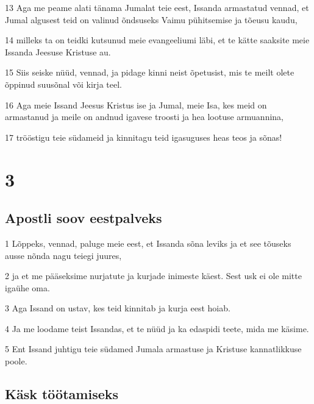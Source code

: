 \par 13 Aga me peame alati tänama Jumalat teie eest, Issanda armastatud vennad, et Jumal algusest teid on valinud õndsuseks Vaimu pühitsemise ja tõeusu kaudu,
\par 14 milleks ta on teidki kutsunud meie evangeeliumi läbi, et te kätte saaksite meie Issanda Jeesuse Kristuse au.
\par 15 Siis seiske nüüd, vennad, ja pidage kinni neist õpetusist, mis te meilt olete õppinud suusõnal või kirja teel.
\par 16 Aga meie Issand Jeesus Kristus ise ja Jumal, meie Isa, kes meid on armastanud ja meile on andnud igavese troosti ja hea lootuse armuannina,
\par 17 trööstigu teie südameid ja kinnitagu teid igasuguses heas teos ja sõnas!


\chapter{3}

\section*{Apostli soov eestpalveks}

\par 1 Lõppeks, vennad, paluge meie eest, et Issanda sõna leviks ja et see tõuseks ausse nõnda nagu teiegi juures,
\par 2 ja et me pääseksime nurjatute ja kurjade inimeste käest. Sest usk ei ole mitte igaühe oma.
\par 3 Aga Issand on ustav, kes teid kinnitab ja kurja eest hoiab.
\par 4 Ja me loodame teist Issandas, et te nüüd ja ka edaspidi teete, mida me käsime.
\par 5 Ent Issand juhtigu teie südamed Jumala armastuse ja Kristuse kannatlikkuse poole.

\section*{Käsk töötamiseks}

